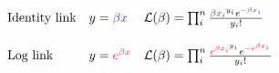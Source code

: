 \documentclass[convert={density=400,outext=.png}]{standalone}
\begin{document}
\pagecolor{almost-white}


$\displaystyle
\begin{array}{lll}
\mbox{Identity link} & \mbox{$y={\color{BlueViolet}\beta x}$}& \mbox{$\mathcal{L}(\beta )=\prod^n_i\frac{{\color{BlueViolet}\beta {x_i}}^{y_i} e^{-{\color{BlueViolet}\beta x_i}}}{y_i!}$}\\
&&\\
\mbox{Log link} &\mbox{$y={\color{Red}e^{\beta x}}$}& \mbox{$\mathcal{L}(\beta ) =\prod^n_i\frac{{\color{Red}e^{\beta {x_i}^{{\color{Black}y_i}}}} e^{-{\color{Red}e^{\beta x_i}}}}{y_i!}$}
\end{array}
$
\end{document}
